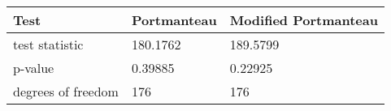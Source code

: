 \begin{tabular}{lll}
Test & Portmanteau & Modified Portmanteau \\ 
\hline 
test statistic & 180.1762 & 189.5799 \\ 
p-value & 0.39885 & 0.22925 \\ 
degrees of freedom & 176 & 176 \\ 
\hline 
\end{tabular}